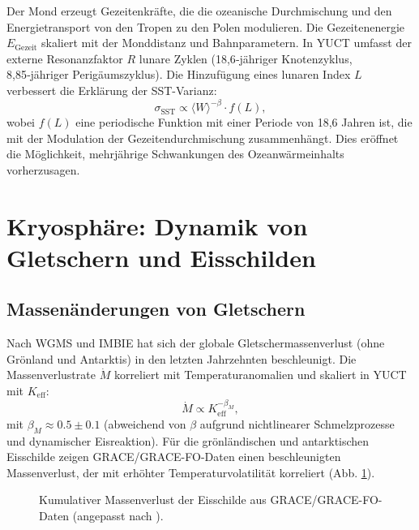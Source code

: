 \documentclass[12pt,a4paper]{article}
\newcommand{\Keff}{K_{\mathrm{eff}}}
\newcommand{\be}{\beta}
\begin{document}
	Der Mond erzeugt Gezeitenkräfte, die die ozeanische Durchmischung und den Energietransport von den Tropen zu den Polen modulieren. Die Gezeitenenergie \(E_{\text{Gezeit}}\) skaliert mit der Monddistanz und Bahnparametern. In YUCT umfasst der externe Resonanzfaktor \(R\) lunare Zyklen (18,6‑jähriger Knotenzyklus, 8,85‑jähriger Perigäumszyklus). Die Hinzufügung eines lunaren Index \(L\) verbessert die Erklärung der SST-Varianz:
	\[
	\sigma_{\text{SST}} \propto \langle W \rangle^{-\be} \cdot f(L),
	\]
	wobei \(f(L)\) eine periodische Funktion mit einer Periode von 18,6 Jahren ist, die mit der Modulation der Gezeitendurchmischung zusammenhängt. Dies eröffnet die Möglichkeit, mehrjährige Schwankungen des Ozeanwärmeinhalts vorherzusagen.
	
	\section{Kryosphäre: Dynamik von Gletschern und Eisschilden}
	
	\subsection{Massenänderungen von Gletschern}
	
	Nach WGMS und IMBIE hat sich der globale Gletschermassenverlust (ohne Grönland und Antarktis) in den letzten Jahrzehnten beschleunigt. Die Massenverlustrate \(\dot{M}\) korreliert mit Temperaturanomalien und skaliert in YUCT mit \(\Keff\):
	\[
	\dot{M} \propto \Keff^{-\beta_M},
	\]
	mit \(\beta_M \approx 0.5 \pm 0.1\) (abweichend von \(\be\) aufgrund nichtlinearer Schmelzprozesse und dynamischer Eisreaktion). Für die grönländischen und antarktischen Eisschilde zeigen GRACE/GRACE-FO-Daten einen beschleunigten Massenverlust, der mit erhöhter Temperaturvolatilität korreliert (Abb. \ref{fig:grace}).
	
	\begin{figure}[htbp]
		\centering
		\caption{Kumulativer Massenverlust der Eisschilde aus GRACE/GRACE-FO-Daten (angepasst nach \cite{IMBIE}).}
		\label{fig:grace}
	\end{figure}
	
\end{document}
